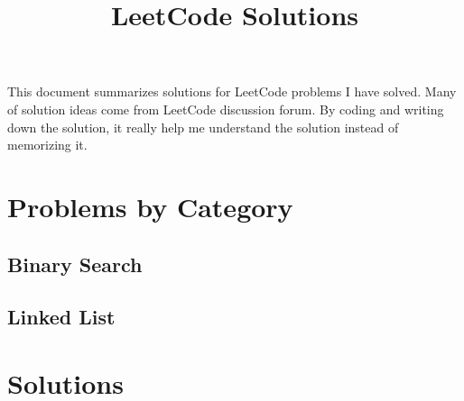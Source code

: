 \documentclass[justified]{tufte-book}
\title{LeetCode Solutions}
\newcommand{\blankpage}{\newpage\hbox{}\thispagestyle{empty}\newpage}
\begin{document}
\frontmatter

\blankpage

\maketitle

\tableofcontents
\listoffigures
\listoftables

\mainmatter
This document summarizes solutions for LeetCode problems I have solved. Many of solution ideas come from LeetCode discussion forum. By coding and writing down the solution, it really help me understand the solution instead of memorizing it.  

\chapter{Problems by Category}
\section{Binary Search}
\section{Linked List}

\chapter{Solutions}


\end{document}
